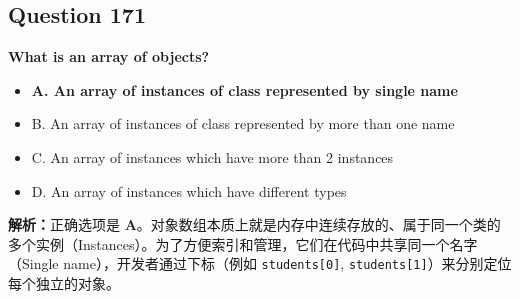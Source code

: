 \documentclass[11pt, a4paper]{article}
\begin{document}
\subsection*{Question 171}
\textbf{What is an array of objects?}
\begin{itemize}
    \item \textbf{A. An array of instances of class represented by single name}
    \item B. An array of instances of class represented by more than one name
    \item C. An array of instances which have more than 2 instances
    \item D. An array of instances which have different types
\end{itemize}

\textbf{解析：}正确选项是 \textbf{A}。对象数组本质上就是内存中连续存放的、属于同一个类的多个实例（Instances）。为了方便索引和管理，它们在代码中共享同一个名字（Single name），开发者通过下标（例如 \texttt{students[0]}, \texttt{students[1]}）来分别定位每个独立的对象。
\end{document}
